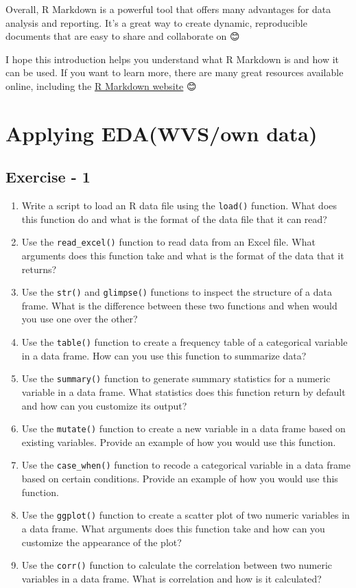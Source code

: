 \documentclass[
]{book}
\begin{document}
Overall, R Markdown is a powerful tool that offers many advantages for data analysis and reporting. It's a great way to create dynamic, reproducible documents that are easy to share and collaborate on 😊

I hope this introduction helps you understand what R Markdown is and how it can be used. If you want to learn more, there are many great resources available online, including the \href{\%5E1\%5E}{R Markdown website} 😊

\hypertarget{applying-edawvsown-data}{%
\section{Applying EDA(WVS/own data)}\label{applying-edawvsown-data}}

\hypertarget{exercise---1}{%
\subsection{Exercise - 1}\label{exercise---1}}

\begin{enumerate}
\def\labelenumi{\arabic{enumi}.}
\item
  Write a script to load an R data file using the \texttt{load()} function. What does this function do and what is the format of the data file that it can read?
\item
  Use the \texttt{read\_excel()} function to read data from an Excel file. What arguments does this function take and what is the format of the data that it returns?
\item
  Use the \texttt{str()} and \texttt{glimpse()} functions to inspect the structure of a data frame. What is the difference between these two functions and when would you use one over the other?
\item
  Use the \texttt{table()} function to create a frequency table of a categorical variable in a data frame. How can you use this function to summarize data?
\item
  Use the \texttt{summary()} function to generate summary statistics for a numeric variable in a data frame. What statistics does this function return by default and how can you customize its output?
\item
  Use the \texttt{mutate()} function to create a new variable in a data frame based on existing variables. Provide an example of how you would use this function.
\item
  Use the \texttt{case\_when()} function to recode a categorical variable in a data frame based on certain conditions. Provide an example of how you would use this function.
\item
  Use the \texttt{ggplot()} function to create a scatter plot of two numeric variables in a data frame. What arguments does this function take and how can you customize the appearance of the plot?
\item
  Use the \texttt{corr()} function to calculate the correlation between two numeric variables in a data frame. What is correlation and how is it calculated?
\end{enumerate}
\end{document}
